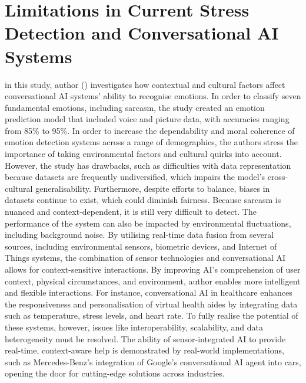 \documentclass[Arial,12pt,openright,twoside]{book}
\begin{document}
  \section{Limitations in Current Stress Detection and Conversational AI Systems}
 in this study, author (\citet{teye2022}) investigates how contextual and cultural factors affect conversational AI systems' ability to recognise emotions. In order to classify seven fundamental emotions, including sarcasm, the study created an emotion prediction model that included voice and picture data, with accuracies ranging from 85\% to 95\%. In order to increase the dependability and moral coherence of emotion detection systems across a range of demographics, the authors stress the importance of taking environmental factors and cultural quirks into account. However, the study has drawbacks, such as difficulties with data representation because datasets are frequently undiversified, which impairs the model's cross-cultural generalisability. Furthermore, despite efforts to balance, biases in datasets continue to exist, which could diminish fairness. Because sarcasm is nuanced and context-dependent, it is still very difficult to detect. The performance of the system can also be impacted by environmental fluctuations, including background noise.
  By utilising real-time data fusion from several sources, including environmental sensors, biometric devices, and Internet of Things systems, the combination of sensor technologies and conversational AI allows for context-sensitive interactions. By improving AI's comprehension of user context, physical circumstances, and environment, author \cite{kush2025} enables more intelligent and flexible interactions. For instance, conversational AI in healthcare enhances the responsiveness and personalisation of virtual health aides by integrating data such as temperature, stress levels, and heart rate. To fully realise the potential of these systems, however, issues like interoperability, scalability, and data heterogeneity must be resolved. The ability of sensor-integrated AI to provide real-time, context-aware help is demonstrated by real-world implementations, such as Mercedes-Benz's integration of Google's conversational AI agent into cars, opening the door for cutting-edge solutions across industries.
\end{document}
